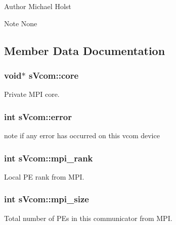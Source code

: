 \begin{DoxyAuthor}{Author}
Michael Holst 
\end{DoxyAuthor}
\begin{DoxyNote}{Note}
None 
\end{DoxyNote}


\subsection{Member Data Documentation}
\subsubsection[{core}]{\setlength{\rightskip}{0pt plus 5cm}void$\ast$ s\-Vcom\-::core}\label{a00001_ad4591b88c95fd3620d40f5568331c1f7}


Private M\-P\-I core. 

\subsubsection[{error}]{\setlength{\rightskip}{0pt plus 5cm}int s\-Vcom\-::error}\label{a00001_a0ccb38a7bc2fdb78dfb05987b5e86f18}


note if any error has occurred on this vcom device 

\subsubsection[{mpi\-\_\-rank}]{\setlength{\rightskip}{0pt plus 5cm}int s\-Vcom\-::mpi\-\_\-rank}\label{a00001_ae5090990cb02c43ed4ed25ecc1901ee2}


Local P\-E rank from M\-P\-I. 

\subsubsection[{mpi\-\_\-size}]{\setlength{\rightskip}{0pt plus 5cm}int s\-Vcom\-::mpi\-\_\-size}\label{a00001_a3370f33a730258e5174ba59b4b595cda}


Total number of P\-Es in this communicator from M\-P\-I. 

